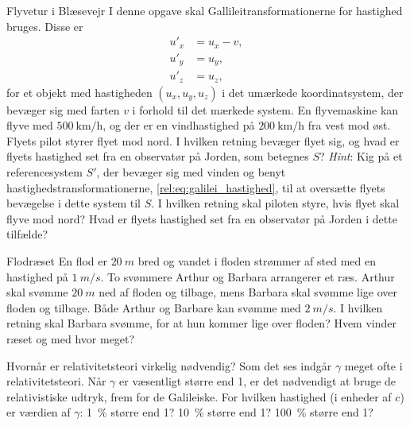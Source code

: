 \documentclass[crop=false, class=memoir]{standalone}
\begin{document}
\begin{opgave}[2]{Flyvetur i Blæsevejr}
I denne opgave skal Gallileitransformationerne for hastighed bruges. Disse er
%
\begin{subequations} \label{rel:eq:galilei_hastighed}
\begin{align}
    u'_x &= u_x-v, \\
	u'_y &= u_y, \\
	u'_z &= u_z,
\end{align}
\end{subequations}
%
for et objekt med hastigheden $(u_x, u_y, u_z)$ i det umærkede koordinatsystem, der bevæger sig med farten $v$ i forhold til det mærkede system. En flyvemaskine kan flyve med  $\SI{500}{\km\per\hour}$, og der er en vindhastighed på $\SI{200}{\km\per\hour}$ fra vest mod øst.
\opg Flyets pilot styrer flyet mod nord. I hvilken retning bevæger flyet sig, og hvad er flyets hastighed set fra en observatør på Jorden, som betegnes $S$? \emph{Hint}: Kig på et referencesystem $S'$, der bevæger sig med vinden og benyt hastighedstransformationerne, \cref{rel:eq:galilei_hastighed}, til at oversætte flyets bevægelse i dette system til $S$.
\opg I hvilken retning skal piloten styre, hvis flyet skal flyve mod nord? Hvad er flyets hastighed set fra en observatør på Jorden i dette tilfælde?
\end{opgave}

\begin{opgave}[2]{Flodræset}
En flod er $\SI{20}{m}$ bred og vandet i floden strømmer af sted med en hastighed på $\SI{1}{m/s}$. To svømmere Arthur og Barbara arrangerer et ræs. Arthur skal svømme $\SI{20}{m}$ ned af floden og tilbage, mens Barbara skal svømme lige over floden og tilbage. Både Arthur og Barbare kan svømme med $\SI{2}{m/s}$.
\opg I hvilken retning skal Barbara svømme, for at hun kommer lige over floden?
\opg Hvem vinder ræset og med hvor meget?
\end{opgave}

\begin{opgave}[1]{Hvornår er relativitetsteori virkelig nødvendig?}
	Som det ses indgår $\gamma$ meget ofte i relativitetsteori. Når $\gamma$ er væsentligt større end 1, er det nødvendigt at bruge de relativistiske udtryk, frem for de Galileiske. For hvilken hastighed (i enheder af $c$) er
	værdien af $\gamma$:
	\opg \SI{1}{\percent} større end 1?
	\opg \SI{10}{\percent} større end 1?
	\opg \SI{100}{\percent} større end 1?
\end{opgave}

\end{document}
